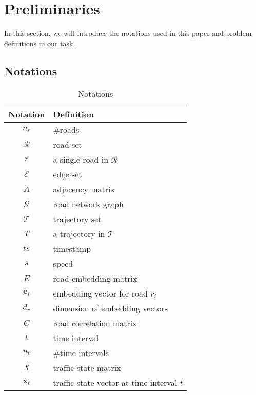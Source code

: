 
\section{Preliminaries}
In this section, we will introduce the notations used in this paper and problem definitions in our task.

\subsection{Notations}
\begin{table}[htb]
    \begin{center}
        \caption{Notations}
        \label{notation_table}
        \begin{tabular}{cl}
            \toprule

            \textbf{Notation} & \textbf{Definition}                       \\

            \midrule

            $n_r$             & \#roads                                   \\
            $\mathcal R$      & road set                                  \\
            $r$               & a single road in $\mathcal R$             \\
            $\mathcal E$      & edge set                                  \\
            $A$               & adjacency matrix                          \\
            $\mathcal G$      & road network graph                        \\
            $\mathcal T$      & trajectory set                            \\
            $T$               & a trajectory in $\mathcal T$              \\
            $ts$              & timestamp                                 \\
            $s$               & speed                                     \\
            $E$               & road embedding matrix                     \\
            $\mathbf{e}_i$    & embedding vector for road $r_i$           \\
            $d_r$             & dimension of embedding vectors            \\
            $C$               & road correlation matrix                   \\
            $t$               & time interval                             \\
            $n_t$             & \#time intervals                          \\
            $X$               & traffic state matrix                      \\
            $\mathbf x_t$     & traffic state vector at time interval $t$ \\

            \bottomrule
        \end{tabular}
    \end{center}
\end{table}
